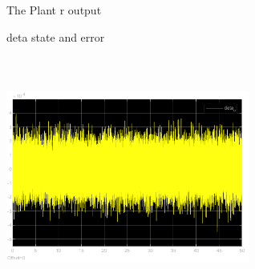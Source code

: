 \documentclass[12pt, a4paper]{article}
\begin{document}
\begin{enumerate}[1.]
\begin{figure}[H]
    \caption{The Plant r output}
    \label{fig:label}
    \end{figure}
    \begin{figure}[H]
        \centering
        \qquad
        \caption{deta state and error}
        \label{fig:example}%
    \end{figure}
\begin{figure}[H]
    \centering
    \includegraphics[width=8cm,height=8cm,scale=0.6]{deta_o.png}

\end{figure}
\end{enumerate}
\end{document}
